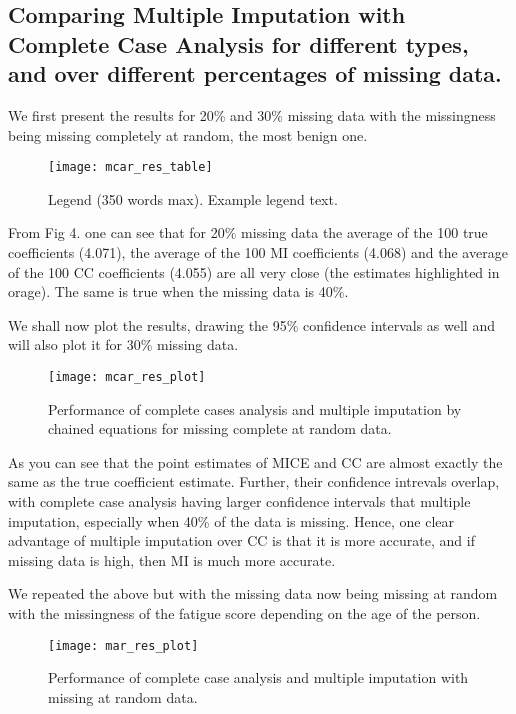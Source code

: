 \documentclass[fleqn,10pt]{wlscirep}\usepackage[]{graphicx}\usepackage[]{color}
\begin{document}
\subsection{Comparing Multiple Imputation with Complete Case Analysis for different types, and over different percentages of missing data.}

We first present the results for 20\% and 30\% missing data with the missingness being missing completely at random, the most benign one. 

\begin{figure}[ht]
\centering
\texttt{[image: mcar\_res\_table]}
\caption{Legend (350 words max). Example legend text.}
\label{fig:mcar_res_table}
\end{figure}

From Fig 4. one can see that for 20\% missing data the average of the 100 true coefficients (4.071), the average of the 100 MI coefficients (4.068) and the average of the 100 CC coefficients (4.055) are all very close (the estimates highlighted in orage). The same is true when the missing data is 40\%.

We shall now plot the results, drawing the 95\% confidence intervals as well and will also plot it for 30\% missing data. 

\begin{figure}[H]
\centering
\texttt{[image: mcar\_res\_plot]}
\caption{Performance of complete cases analysis and multiple imputation by chained equations for missing complete at random data.}
\label{fig:mcar_res_plot}
\end{figure}

As you can see that the point estimates of MICE and CC are almost exactly the same as the true coefficient estimate. Further, their confidence intrevals overlap, with complete case analysis having larger confidence intervals that multiple imputation, especially when 40\% of the data is missing. Hence, one clear advantage of multiple imputation over CC is that it is more accurate, and if missing data is high, then MI is much more accurate. 

We repeated the above but with the missing data now being missing at random with the missingness of the fatigue score depending on the age of the person. 


\begin{figure}[H]
\centering
\texttt{[image: mar\_res\_plot]}
\caption{Performance of complete case analysis and multiple imputation with missing at random data.}
\label{fig:mar_res_plot}
\end{figure}
\end{document}
